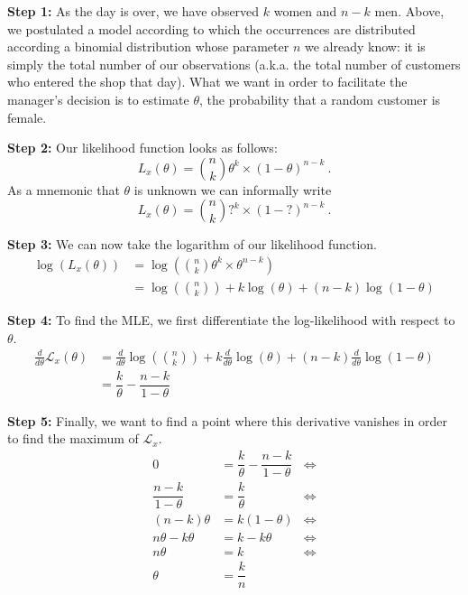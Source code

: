 \textbf{Step 1:} As the day is over, we have observed $ k $ women and $ n-k $ men. Above, we postulated a model
according to which the
occurrences are distributed according a binomial distribution whose parameter $ n $ we already know: it
is simply the total number of our observations (a.k.a. the total number of customers who entered the shop 
that day). What we want in order to facilitate the manager's decision is to estimate $ \theta $, the
probability that a random customer is female. 

\textbf{Step 2:} Our likelihood function looks as follows:
\begin{equation}
L_{x}(\theta) = \binom{n}{k} \theta^{k} \times (1 - \theta)^{n-k} \ .
\end{equation}
As a mnemonic that $ \theta $ is unknown we can informally write
$$ L_{x}(\theta) = \binom{n}{k} ?^{k} \times (1-?)^{n-k} \ . $$

\textbf{Step 3:} We can now take the logarithm of our likelihood function.
\begin{align}
\log(L_{x}(\theta)) &= \log\left(\binom{n}{k} \theta^{k} \times \theta^{n-k} \right) \\
&= \log \left(\binom{n}{k}\right) + k\log(\theta) + (n-k)\log(1-\theta)
\end{align}

\textbf{Step 4:} To find the MLE, we first differentiate the log-likelihood with respect to $ \theta $.
\begin{align}
\frac{d}{d \theta} \mathcal{L}_{x}(\theta)
&= \frac{d}{d \theta} \log \left(\binom{n}{k}\right) + k \frac{d}{d \theta} \log(\theta) + (n-k) \frac{d}{d \theta} \log(1-\theta) \\
&= \dfrac{k}{\theta} - \dfrac{n-k}{1-\theta}
\end{align}

\textbf{Step 5:} Finally, we want to find a point where this derivative vanishes in order to find the maximum of $ \mathcal{L}_{x} $.
\begin{align}
0 &= \dfrac{k}{\theta} - \dfrac{n-k}{1-\theta} &\Leftrightarrow \\
\dfrac{n-k}{1- \theta} &= \dfrac{k}{\theta} &\Leftrightarrow \\
(n-k) \theta &= k (1 - \theta) &\Leftrightarrow \\
n\theta- k\theta &= k - k \theta &\Leftrightarrow \\
n\theta&= k &\Leftrightarrow \\
\theta &= \dfrac{k}{n}
\end{align}

